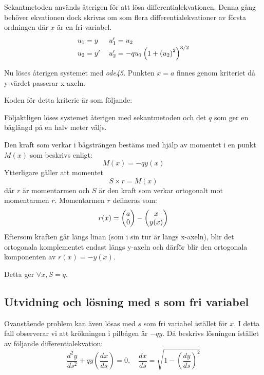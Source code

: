\documentclass[a4paper,11pt,twoside]{article}
\newcommand*\colvec[3][]{
    \begin{pmatrix}\ifx\relax#1\relax\else#1\\\fi#2\\#3\end{pmatrix}
}
\begin{document}
Sekantmetoden används återigen för att lösa differentialekvationen. Denna gång behöver ekvationen dock skrivas om som flera differentialekvationer av första ordningen där $x$ är en fri variabel.
\begin{align}
\begin{tabular}{ l l }
	$u_1 = y$ & $u_1' = u_2$ \\
	$u_2 = y'$ & $u_2' = -qu_1\left(1 + \left(u_2\right)^2\right)^{3/2}$
\end{tabular}
\nonumber
\end{align}

Nu löses återigen systemet med \textit{ode45}. Punkten $x=a$ finnes genom  kriteriet då y-värdet passerar x-axeln.

Koden för detta kriterie är som följande:
\begin{listing}


\end{listing}

Följaktligen löses systemet återigen med sekantmetoden och det $q$ som ger en båglängd på en halv meter väljs.

Den kraft som verkar i bågsträngen bestäms med hjälp av momentet i en punkt $M(x)$ som beskrivs enligt:
\begin{equation}\label{eq:moment}
M(x) = -qy(x)
\end{equation}
Ytterligare gäller att momentet
\begin{equation}
	S \times r = M(x)
\end{equation}
där $r$ är momentarmen och $S$ är den kraft som verkar ortogonalt mot momentarmen $r$. Momentarmen $r$ defineras som:
\begin{equation}
	r(x) = \colvec{a}{0}-\colvec{x}{y(x)}
\end{equation}
Eftersom kraften går längs linan (som i sin tur är längs x-axeln), blir det ortogonala komplementet endast längs y-axeln och därför blir den ortogonala komponenten av $r(x) = -y(x)$.

Detta ger $\forall x, S = q$.

\subsection{Utvidning och lösning med s som fri variabel}
Ovanstående problem kan även lösas med $s$ som fri variabel istället för $x$. I detta fall observerar vi att krökningen i pilbågen är $-qy$. Då beskrivs lösningen istället av följande differentialekvation:
\begin{equation}
	\dfrac{d^2y}{ds^2}+qy\left(\dfrac{dx}{ds}\right)=0, \quad \dfrac{dx}{ds} = \sqrt{1-\left(\dfrac{dy}{ds}\right)^2}
\end{equation}
\end{document}
